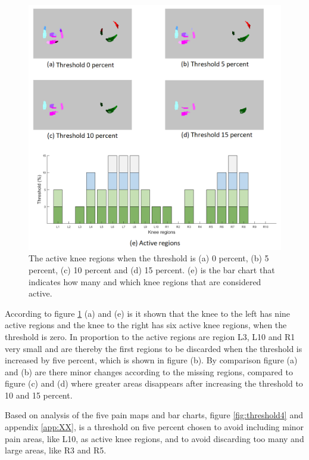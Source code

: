\begin{figure} [H]
\centering
\includegraphics[width=1\textwidth]{figures/threshold4}
\caption{The active knee regions when the threshold is (a) 0 percent, (b) 5 percent, (c) 10 percent and (d) 15 percent. (e) is the bar chart that indicates how many and which knee regions that are considered active.}
\label{fig:threshold}
\end{figure}

\noindent
According to figure \ref{fig:threshold} (a) and (e) is it shown that the knee to the left has nine active regions and the knee to the right has six active knee regions, when the threshold is zero. In proportion to the active regions are region L3, L10 and R1 very small and are thereby the first regions to be discarded when the threshold is increased by five percent, which is shown in figure (b). 
By comparison figure (a) and (b) are there minor changes according to the missing regions, compared to figure (c) and (d) where greater areas disappears after increasing the threshold to 10 and 15 percent. 

Based on analysis of the five pain maps and bar charts, figure \ref{fig:threshold4} and appendix \ref{app:XX}, is a threshold on five percent chosen to avoid including minor pain areas, like L10, as active knee regions, and to avoid discarding too many and large areas, like R3 and R5.


